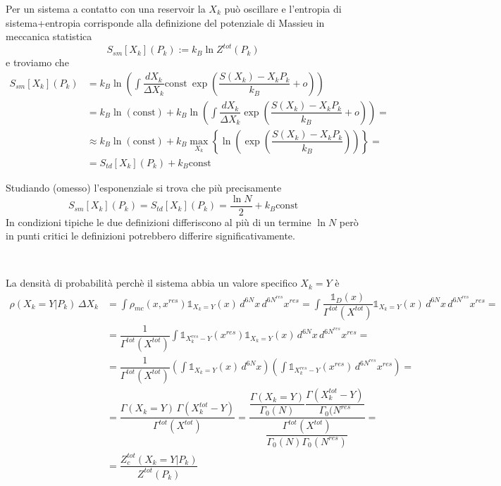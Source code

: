 \documentclass[11pt,a4paper,twoside]{book}
\numberwithin{equation}{section} %
\begin{document}
Per un sistema a contatto con una reservoir la $X_k$ può oscillare e l'entropia di sistema+entropia corrisponde alla definizione del potenziale di Massieu in meccanica statistica
\[
S_{sm}[X_k](P_k):=k_B\ln Z^{tot}(P_k)
\]
e troviamo che
\begin{align*}
S_{sm}[X_k](P_k) &= k_B\ln\left( \int \dfrac{dX_k}{\Delta X_k} \text{const} \>\exp{\left( \dfrac{S(X_k)-X_kP_k}{k_B} +o \right)} \right)\\
 & = k_B\ln(\text{const})+k_B\ln\left( \int \dfrac{dX_k}{\Delta X_k} \exp{\left( \dfrac{S(X_k)-X_kP_k}{k_B} +o \right)} \right) =\\
  & \approx k_B\ln(\text{const})+k_B\max_{X_k}\left\{ \ln\left( \exp{\left( \dfrac{S(X_k)-X_kP_k}{k_B} \right)} \right)\right\} =\\
 &=S_{td}[X_k](P_k)+k_B\text{const}
\end{align*}

Studiando (omesso) l'esponenziale si trova che più precisamente
\begin{equation}
S_{sm}[X_k](P_k)=S_{td}[X_k](P_k)=\dfrac{\ln N}{2} +k_B\text{const}
\end{equation}
In condizioni tipiche le due definizioni differiscono al più di un termine $\ln N$ però in punti critici le definizioni potrebbero differire significativamente.
\par~\par
La densità di probabilità perchè il sistema abbia un valore specifico $X_k=Y$ è
\begin{align*}
\rho(X_k=Y|P_k) \,\Delta X_k&=\int \rho_{mc}(x,x^{res})\mathbb{1}_{X_k=Y}(x)\,d^{6N}x\,d^{6N^{res}}x^{res} =
   \int \dfrac{\mathbb{1}_{D}(x)}{\Gamma^{tot}(X^{tot})} \mathbb{1}_{X_k=Y}(x)\,d^{6N}x\,d^{6N^{res}}x^{res} =\\
&= \dfrac{1}{\Gamma^{tot}(X^{tot})} \int \mathbb{1}_{X_k^{res}-Y}(x^{res}) \mathbb{1}_{X_k=Y}(x)\,d^{6N}x\,d^{6N^{res}}x^{res}=\\
&= \dfrac{1}{\Gamma^{tot}(X^{tot})} \left( \int  \mathbb{1}_{X_k=Y}(x)\,d^{6N}x \right) \left( \int \mathbb{1}_{X_k^{res}-Y}(x^{res})\,d^{6N^{res}}x^{res}\right) =\\
&= \dfrac{\Gamma(X_k=Y)\,\Gamma(X_k^{tot}-Y)}{\Gamma^{tot}(X^{tot})}=\dfrac{\dfrac{\Gamma(X_k=Y)}{\Gamma_0(N)}\dfrac{\Gamma(X_k^{tot}-Y)}{\Gamma_0(N^{res}} }{\dfrac{\Gamma^{tot}(X^{tot})}{\Gamma_0(N)\Gamma_0(N^{res})}} =\\
&= \dfrac{Z_c^{tot}(X_k=Y|P_k)}{Z^{tot}(P_k)} 
\end{align*}
\end{document}
